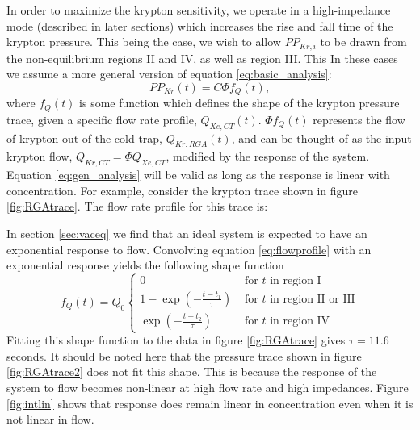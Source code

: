 \documentclass[12pt]{article}
\begin{document}
In order to maximize the krypton sensitivity, we operate in a high-impedance mode (described in later sections) which increases the rise and fall time of the krypton pressure. This being the case, we wish to allow $PP_{Kr,i}$ to be drawn from the non-equilibrium regions II and IV, as well as region III. This In these cases we assume a more general version of equation \ref{eq:basic_analysis}:
\begin{equation}
\label{eq:gen_analysis}
PP_{Kr}(t)=C\Phi f_{Q}(t),
\end{equation}
where $f_{Q}(t)$ is some function which defines the shape of the krypton pressure trace, given a specific flow rate profile, $Q_{Xe,CT}(t)$. $\Phi f_{Q}(t)$ represents the flow of krypton out of the cold trap, $Q_{Kr,RGA}(t)$, and can be thought of as the input krypton flow, $Q_{Kr,CT}=\Phi Q_{Xe,CT}$, modified by the response of the system. Equation \ref{eq:gen_analysis} will be valid as long as the response is linear with concentration. For example, consider the krypton trace shown in figure \ref{fig:RGAtrace}. The flow rate profile for this trace is:

In section \ref{sec:vaceq} we find that an ideal system is expected to have an exponential response to flow. Convolving equation \ref{eq:flowprofile} with an exponential response yields the following shape function
\begin{equation}
\label{eq:shapefunc}
f_Q(t) = Q_0
  \begin{cases}
    0&\textrm{ for $t$ in region I}\\
    1-\exp(-\frac{t-t_1}{\tau})&\textrm{ for $t$ in region II or III}\\
    \exp(-\frac{t-t_2}{\tau})&\textrm{ for $t$ in region IV}
  \end{cases}
\end{equation}
Fitting this shape function to the data in figure \ref{fig:RGAtrace} gives $\tau = 11.6$ seconds. It should be noted here that the pressure trace shown in figure \ref{fig:RGAtrace2} does not fit this shape. This is because the response of the system to flow becomes non-linear at high flow rate and high impedances. Figure \ref{fig:intlin} shows that response does remain linear in concentration even when it is not linear in flow.
\end{document}
